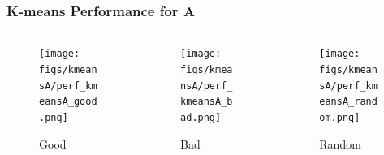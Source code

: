 \documentclass[11pt]{beamer}
\begin{document}
\begin{frame}

\frametitle{K-means Performance for A}
\begin{columns}
\begin{column}{.3\textwidth}
\begin{figure}
  \texttt{[image: figs/kmeansA/perf\_kmeansA\_good.png]}
  \caption{Good}
\end{figure}
\end{column}
\begin{column}{.3\textwidth}
\begin{figure}
  \texttt{[image: figs/kmeansA/perf\_kmeansA\_bad.png]}
  \caption{Bad}
\end{figure}
\end{column}

\begin{column}{.3\textwidth}
\begin{figure}
  \texttt{[image: figs/kmeansA/perf\_kmeansA\_random.png]}
  \caption{Random}
\end{figure}
\end{column}

\end{columns}
\end{frame}

\end{document}
